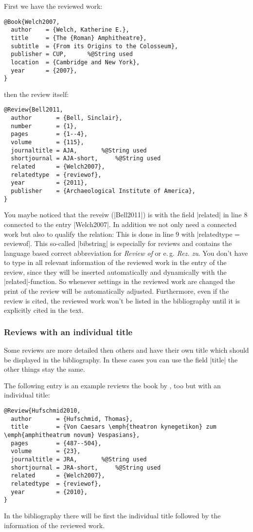 \documentclass[a4paper,
10pt,
greek,
french,
spanish,
italian,
ngerman,
english
]{ltxdoc}
\begin{document}
First we have the reviewed work:
\begin{lstlisting}[style=bibentry,label=Welch2007,caption={{@}Book\{Welch2007,…\} }]
@Book{Welch2007,
  author    = {Welch, Katherine E.},
  title     = {The {Roman} Amphitheatre},
  subtitle  = {From its Origins to the Colosseum},
  publisher = CUP,		%@String used
  location  = {Cambridge and New York},
  year      = {2007},
}
\end{lstlisting}
then the review itself:
\begin{lstlisting}[style=bibentry,label=Bell2011,caption={{@}Review\{Bell2011,…\} }]
@Review{Bell2011,
  author       = {Bell, Sinclair},
  number       = {1},
  pages        = {1--4},
  volume       = {115},
  journaltitle = AJA,		%@String used
  shortjournal = AJA-short,		%@String used
  related      = {Welch2007},
  relatedtype  = {reviewof},
  year         = {2011},
  publisher    = {Archaeological Institute of America},
}
\end{lstlisting}
You maybe noticed that the reveiw (|Bell2011|) is with the field |related| in line 8 connected to the entry |Welch2007|.
In addition we not only need a connected work but also to qualify the relation:
This is done in line 9 with |relatedtype = {reviewof}|.
This so-called |bibstring| is especially for reviews and contains the language based correct abbreviation for \emph{Review of} or e.\,g. \emph{Rez. zu}.
You don’t have to type in all relevant information of the reviewed work in the entry of the review, 
since they will be inserted automatically and dynamically with the  |related|-function. 
So whenever settings in the reviewed work are changed the print of the review will be automatically adjusted. 
Furthermore, even if the review is cited, the reviewed work won't be listed in the bibliography until it is explicitly cited in the text.


\subsubsection{Reviews with an individual title}
Some reviews are more detailed then others and  have their own title which should be displayed in the bibliography.
In these cases you can use the field |title| the other things stay the same.

The following entry is an example reviews the book by \citeauthor*{Welch2007}, too but with an individual title:
\begin{lstlisting}[style=bibentry,label=Hufschmid2010,caption={{@}Review\{Hufschmid2010,…\} }]
@Review{Hufschmid2010,
  author       = {Hufschmid, Thomas},
  title        = {Von Caesars \emph{theatron kynegetikon} zum \emph{amphitheatrum novum} Vespasians},
  pages        = {487--504},
  volume       = {23},
  journaltitle = JRA,		%@String used
  shortjournal = JRA-short,		%@String used
  related      = {Welch2007},
  relatedtype  = {reviewof},
  year         = {2010},
}
\end{lstlisting}
In the bibliography there will be first the individual title followed by the information of the reviewed work.
\end{document}
